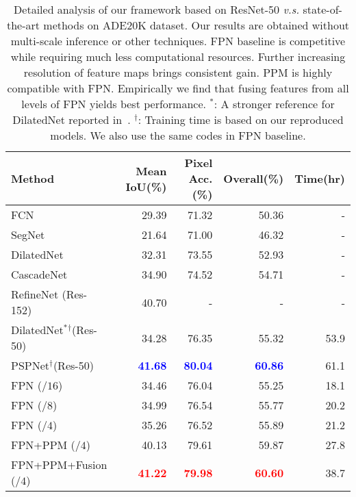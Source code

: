 \documentclass[runningheads]{llncs}
\begin{document}
\begin{table}[!tbp]
\begin{center}
\setlength{\tabcolsep}{5.8pt}
\begin{tabular}{l r r r | r}
\toprule[0.8pt]
Method & Mean IoU(\%) & Pixel Acc.(\%) & Overall(\%) & Time(hr) \\
\hline
FCN~\cite{long2015fully} & 29.39 & 71.32 & 50.36 & - \\
SegNet~\cite{badrinarayanan2017segnet} & 21.64 & 71.00 & 46.32 & - \\
DilatedNet~\cite{yu2015multi} & 32.31 & 73.55 & 52.93 & - \\
CascadeNet~\cite{zhou2017scene} & 34.90 & 74.52 & 54.71 & - \\
RefineNet (Res-152)~\cite{lin2017refinenet} & 40.70 & - & - & - \\
DilatedNet${}^{*}{}^{\dagger}$(Res-50)~\cite{zhao2017pyramid} & 34.28 & 76.35 & 55.32 & 53.9 \\
PSPNet${}^{\dagger}$(Res-50)~\cite{zhao2017pyramid} & \textcolor{blue}{\textbf{41.68}} & \textcolor{blue}{\textbf{80.04}} & \textcolor{blue}{\textbf{60.86}} & 61.1 \\
\hline
FPN ($/16$) & 34.46 & 76.04 & 55.25 & 18.1 \\
FPN ($/8$) & 34.99 & 76.54 & 55.77 & 20.2 \\
FPN ($/4$) & 35.26 & 76.52 & 55.89 & 21.2 \\
FPN+PPM ($/4$) & 40.13 & 79.61 & 59.87 & 27.8 \\
FPN+PPM+Fusion ($/4$) & \textcolor{red}{\textbf{41.22}} & \textcolor{red}{\textbf{79.98}} & \textcolor{red}{\textbf{60.60}} & 38.7 \\
\bottomrule[0.8pt]
\end{tabular}
\end{center}
\caption{Detailed analysis of our framework based on ResNet-50 \emph{v.s.} state-of-the-art methods on ADE20K dataset. Our results are obtained without multi-scale inference or other techniques. FPN baseline is competitive while requiring much less computational resources. Further increasing resolution of feature maps brings consistent gain. PPM is highly compatible with FPN. Empirically we find that fusing features from all levels of FPN yields best performance. ${}^{*}$: A stronger reference for DilatedNet reported in~\cite{zhao2017pyramid}. ${}^{\dagger}$: Training time is based on our reproduced models. We also use the same codes in FPN baseline.}
\label{tab:framework_on_ade}
\end{table}
\end{document}
